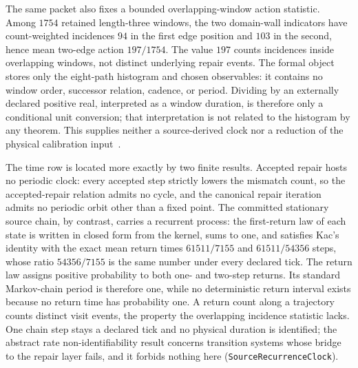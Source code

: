 \documentclass[11pt]{article}
\begin{document}
The same packet also fixes a bounded overlapping-window action statistic.
Among \(1754\) retained length-three windows, the two domain-wall indicators
have count-weighted incidences \(94\) in the first edge position and \(103\)
in the second, hence mean two-edge action \(197/1754\).  The value \(197\)
counts incidences inside overlapping windows, not distinct underlying repair
events.  The formal object stores only the eight-path histogram and chosen
observables: it contains no window order, successor relation, cadence, or
period.  Dividing by an externally declared positive real, interpreted as a
window duration, is therefore only a conditional unit conversion; that
interpretation is not related to the histogram by any theorem.  This
supplies neither a source-derived clock nor a reduction of the physical
calibration input~\cite{ophrepo}.

The time row is located more exactly by two finite results. Accepted repair
hosts no periodic clock: every accepted step strictly lowers the mismatch
count, so the accepted-repair relation admits no cycle, and the canonical
repair iteration admits no periodic orbit other than a fixed point. The
committed stationary source chain, by contrast, carries a recurrent
process: the first-return law of each state is written in closed form from
the kernel, sums to one, and satisfies Kac's identity with the exact mean
return times \(61511/7155\) and \(61511/54356\) steps, whose ratio
\(54356/7155\) is the same number under every declared tick. The return
law assigns positive probability to both one- and two-step returns. Its
standard Markov-chain period is therefore one, while no deterministic return
interval exists because no return time has probability one. A return count along
a trajectory counts distinct visit events, the property the overlapping
incidence statistic lacks. One chain step stays a declared tick and no
physical duration is identified; the abstract rate non-identifiability
result concerns transition systems whose bridge to the repair layer fails,
and it forbids nothing here
(\texttt{SourceRecurrenceClock}).
\end{document}
